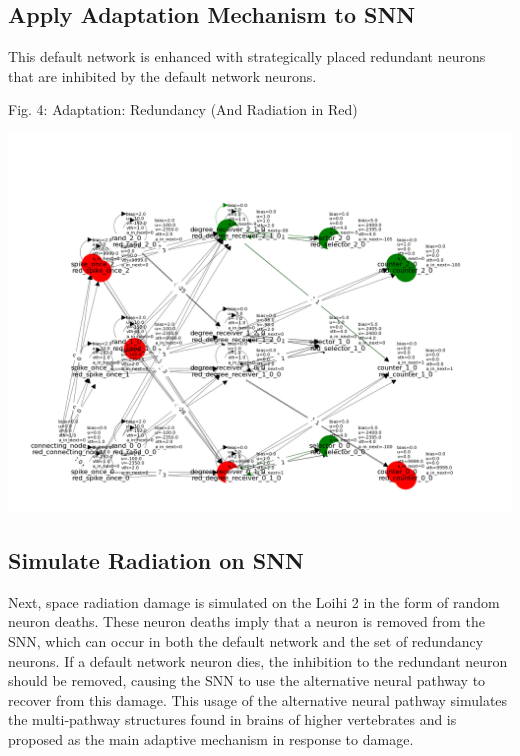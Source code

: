 \subsection{Apply Adaptation Mechanism to SNN}\label{subsec:adaptation}
This default network is enhanced with strategically placed redundant neurons that are inhibited by the default network neurons. 
\begin{rudifig}{\hsize}{Fig. 4: Adaptation: Redundancy (And Radiation in Red)}
    
    \hspace{-1em}
    \includegraphics[width=\linewidth]{latex/Images/rad_adapted.png}
    \label{fig:encoded_snn}
\end{rudifig}
\vspace{5em}


\subsection{Simulate Radiation on SNN}\label{subsec:}
Next, space radiation damage is simulated on the Loihi 2 in the form of random neuron deaths. These neuron deaths imply that a neuron is removed from the SNN, which can occur in both the default network and the set of redundancy neurons. If a default network neuron dies, the inhibition to the redundant neuron should be removed, causing the SNN to use the alternative neural pathway to recover from this damage. This usage of the alternative neural pathway simulates the multi-pathway structures found in brains of higher vertebrates and is proposed as the main adaptive mechanism in response to damage.

